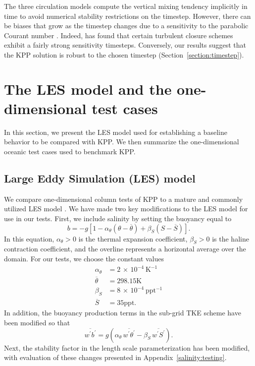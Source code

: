 \documentclass[preprint,12pt,authoryear]{agujournal}
\begin{document}
The three circulation models compute the vertical mixing tendency implicitly in time to avoid numerical stability restrictions on the timestep.  However, there can be biases that grow as the timestep changes due to a sensitivity to the parabolic Courant number \citep{Lemarie_etal2012a}.  Indeed, \cite{Reffray:2015kn} has found that certain turbulent closure schemes exhibit a fairly strong sensitivity timesteps.  Conversely, our results suggest that the KPP solution is robust to the chosen timestep (Section~\ref{section:timestep}).

\section{The LES model and the one-dimensional test cases}
\label{test_cases}

In this section, we present the LES model used for establishing a baseline behavior to be compared with KPP.  We then summarize the one-dimensional oceanic test cases used to benchmark KPP.

\subsection{Large Eddy Simulation (LES) model}

We compare one-dimensional column tests of KPP to a mature and commonly utilized LES model \citep{Moeng1984,McWilliams1997,sullivan2007surface}.  We have made two key modifications to the LES model for use in our tests.  First, we include salinity by setting the buoyancy equal to 
\begin{equation}
b = -g \left[ 1 - \alpha_{\theta} \left(\theta - \overline{\theta} \right) + \beta_S \left(S - \overline{S} \right) \right].
\label{eq:buoyancy}
\end{equation}
In this equation, $\alpha_{\theta} > 0$ is the thermal expansion coefficient, $\beta_S > 0$ is the haline contraction coefficient, and the overline represents a horizontal average over the domain. For our tests, we choose the constant values 
\begin{subequations}
\begin{align}
 \alpha_{\theta} &= 2 \, \times \, 10^{-4}~\mbox{K}^{-1}
 \label{eq:alphaT}
 \\
 \overline{\theta} &= 298.15 \mbox{K} \label{thetaBar}\\
 \beta_S &= 8\, \times \, 10^{-4}~\mbox{ppt}^{-1} \label{eq:betaT}\\
 \overline{S} &= 35 \mbox{ppt} .
\label{eq:sbar}
\end{align}
 \end{subequations}
In addition, the buoyancy production terms in the sub-grid TKE scheme have been modified so that 
\begin{equation}
\overline{w^\prime b^\prime} = g \left( \alpha_{\theta} \, \overline{w^\prime \theta^\prime} - \beta_S \, \overline{w^\prime S^\prime} \right).
\label{eq:wb}
\end{equation}
Next, the stability factor in the length scale parameterization \citep{deardorff1980stratocumulus} has been modified, with evaluation of these changes presented in Appendix~\ref{salinity:testing}.
\end{document}
